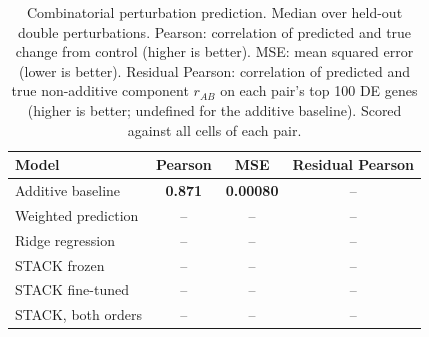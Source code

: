\begin{table}[t]
    \caption{Combinatorial perturbation prediction. Median over held-out double
    perturbations. Pearson: correlation of predicted and true change from control
    (higher is better). MSE: mean squared error (lower is better). Residual Pearson:
    correlation of predicted and true non-additive component $r_{AB}$ on each pair's
    top 100 DE genes (higher is better; undefined for the additive baseline).
    Scored against all cells of each pair.}
    \label{tab:composition_results_allcells}
    \centering
    \begin{tabular}{lccc}
        \toprule
        Model & Pearson & MSE & Residual Pearson \\
        \midrule
        Additive baseline     & \textbf{0.871} & \textbf{0.00080} & -- \\
        Weighted prediction   & -- & -- & -- \\
        Ridge regression      & -- & -- & -- \\
        STACK frozen          & -- & -- & -- \\
        STACK fine-tuned      & -- & -- & -- \\
        STACK, both orders    & -- & -- & -- \\
        \bottomrule
    \end{tabular}
\end{table}
